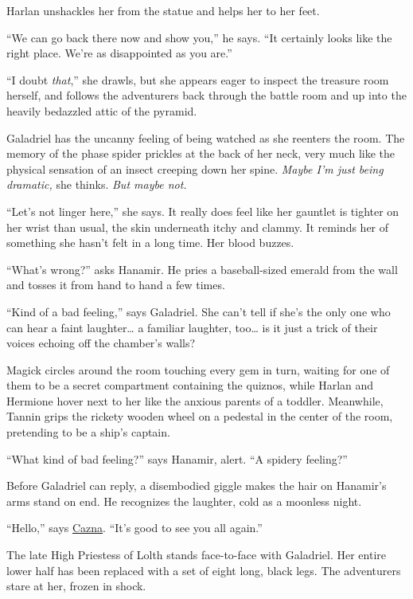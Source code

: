 \documentclass[smalldemyvopaper,11pt,twoside,onecolumn,openright,extrafontsizes]{memoir}
\begin{document}
Harlan unshackles her from the statue and helps her to her feet.

``We can go back there now and show you,'' he says. ``It certainly looks
like the right place. We're as disappointed as you are.''

``I doubt \emph{that},'' she drawls, but she appears eager to inspect
the treasure room herself, and follows the adventurers back through the
battle room and up into the heavily bedazzled attic of the pyramid.

Galadriel has the uncanny feeling of being watched as she reenters the
room. The memory of the phase spider prickles at the back of her neck,
very much like the physical sensation of an insect creeping down her
spine. \emph{Maybe I'm just being dramatic,} she thinks. \emph{But maybe
not.}

``Let's not linger here,'' she says. It really does feel like her
gauntlet is tighter on her wrist than usual, the skin underneath itchy
and clammy. It reminds her of something she hasn't felt in a long time.
Her blood buzzes.

``What's wrong?'' asks Hanamir. He pries a baseball-sized emerald from
the wall and tosses it from hand to hand a few times.

``Kind of a bad feeling,'' says Galadriel. She can't tell if she's the
only one who can hear a faint laughter\ldots{} a familiar laughter,
too\ldots{} is it just a trick of their voices echoing off the chamber's
walls?

Magick circles around the room touching every gem in turn, waiting for
one of them to be a secret compartment containing the quiznos, while
Harlan and Hermione hover next to her like the anxious parents of a
toddler. Meanwhile, Tannin grips the rickety wooden wheel on a pedestal
in the center of the room, pretending to be a ship's captain.

``What kind of bad feeling?'' says Hanamir, alert. ``A spidery
feeling?''

Before Galadriel can reply, a disembodied giggle makes the hair on
Hanamir's arms stand on end. He recognizes the laughter, cold as a
moonless night.

``Hello,'' says \href{/characters/cazna/}{Cazna}. ``It's good to see you
all again.''

The late High Priestess of Lolth stands face-to-face with Galadriel. Her
entire lower half has been replaced with a set of eight long, black
legs. The adventurers stare at her, frozen in shock.
\end{document}
